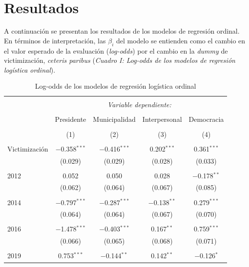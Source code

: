 \documentclass[letterpaper]{article}
\begin{document}
\vspace{-0.4cm}

\section{Resultados}

A continuación se presentan los resultados de los modelos de regresión ordinal. En términos de interpretación, las $\beta_i$ del modelo se entienden como el cambio en el valor esperado de la evaluación (\emph{log-odds}) por el cambio en la \emph{dummy} de  victimización, \emph{ceteris paribus} (\emph{Cuadro I: Log-odds de los modelos de regresión logística ordinal}).\\

\begin{table}[!htbp] \centering 
  \caption{Log-odds de los modelos de regresión logística ordinal} 
  \label{} 
\begin{tabular}{@{\extracolsep{5pt}}lcccc} 
\\[-1.8ex]\hline 
\hline \\[-1.8ex] 
 & \multicolumn{4}{c}{\textit{Variable dependiente:}} \\ 
\cline{2-5} 
\\[-1.8ex] & Presidente & Municipalidad & Interpersonal & Democracia \\
\\[-1.8ex] & (1) & (2) & (3) & (4)\\ 
\hline \\[-1.8ex] 
 Victimización & $-$0.358$^{***}$ & $-$0.416$^{***}$ & 0.202$^{***}$ & 0.361$^{***}$ \\ 
  & (0.029) & (0.029) & (0.028) & (0.033) \\ 
  & & & & \\ 
 2012 & 0.052 & 0.050 & 0.028 & $-$0.178$^{**}$ \\ 
  & (0.062) & (0.064) & (0.067) & (0.085) \\ 
  & & & & \\ 
 2014 & $-$0.797$^{***}$ & $-$0.287$^{***}$ & $-$0.138$^{**}$ & 0.279$^{***}$ \\ 
  & (0.064) & (0.064) & (0.067) & (0.070) \\ 
  & & & & \\ 
 2016 & $-$1.478$^{***}$ & $-$0.403$^{***}$ & 0.167$^{**}$ & 0.759$^{***}$ \\ 
  & (0.066) & (0.065) & (0.068) & (0.071) \\ 
  & & & & \\ 
 2019 & 0.753$^{***}$ & $-$0.144$^{**}$ & 0.142$^{**}$ & $-$0.126$^{*}$ \\ 

\end{tabular}
\end{table}
\end{document}
